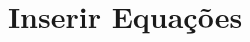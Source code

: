\documentclass[brazilian]{beamer}
\title{Inserir Equações}
\begin{document}
    \frame{\titlepage}
\end{document}
